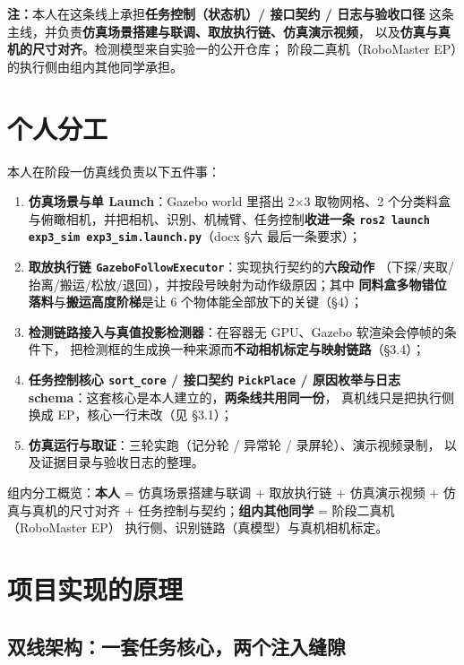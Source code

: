 \documentclass[12pt,a4paper]{ctexart}
\begin{document}
\textbf{注：}本人在这条线上承担\textbf{任务控制（状态机）/ 接口契约 / 日志与验收口径}
这条主线，并负责\textbf{仿真场景搭建与联调、取放执行链、仿真演示视频}，
以及\textbf{仿真与真机的尺寸对齐}。检测模型来自实验一的公开仓库；
阶段二真机（RoboMaster EP）的执行侧由组内其他同学承担。

\section{个人分工}

本人在阶段一仿真线负责以下五件事：

\begin{enumerate}[leftmargin=1.8em]
  \item \textbf{仿真场景与单 Launch}：Gazebo world 里搭出 2$\times$3 取物网格、2 个分类料盒
        与俯瞰相机，并把相机、识别、机械臂、任务控制\textbf{收进一条
        \texttt{ros2 launch exp3\_sim exp3\_sim.launch.py}}（docx §六 最后一条要求）；
  \item \textbf{取放执行链 \texttt{GazeboFollowExecutor}}：实现执行契约的\textbf{六段动作}
        （下探/夹取/抬离/搬运/松放/退回），并按段号映射为动作级原因；其中
        \textbf{同料盒多物错位落料}与\textbf{搬运高度阶梯}是让 6 个物体能全部放下的关键（§4）；
  \item \textbf{检测链路接入与真值投影检测器}：在容器无 GPU、Gazebo 软渲染会停帧的条件下，
        把检测框的生成换一种来源而\textbf{不动相机标定与映射链路}（§3.4）；
  \item \textbf{任务控制核心 \texttt{sort\_core} / 接口契约 \texttt{PickPlace} /
        原因枚举与日志 schema}：这套核心是本人建立的，\textbf{两条线共用同一份}，
        真机线只是把执行侧换成 EP，核心一行未改（见 §3.1）；
  \item \textbf{仿真运行与取证}：三轮实跑（记分轮 / 异常轮 / 录屏轮）、演示视频录制，
        以及证据目录与验收日志的整理。
\end{enumerate}

组内分工概览：\textbf{本人} = 仿真场景搭建与联调 + 取放执行链 + 仿真演示视频
+ 仿真与真机的尺寸对齐 + 任务控制与契约；\textbf{组内其他同学} = 阶段二真机（RoboMaster EP）
执行侧、识别链路（真模型）与真机相机标定。

\section{项目实现的原理}

\subsection{双线架构：一套任务核心，两个注入缝隙}
\end{document}

